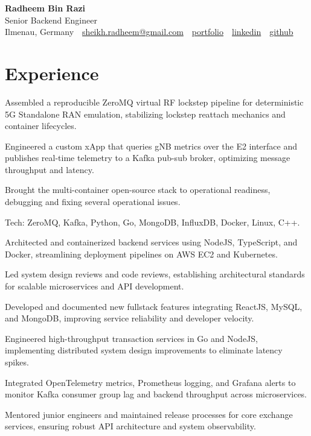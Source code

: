 \documentclass[10pt,a4paper]{resume}
\makeatletter
\newcommand{\Portfolio}{https://radheem.github.io/my-cv}
\newcommand{\PortfolioText}{portfolio}
\newcommand{\GitHub}{https://github.com/radheem}
\newcommand{\LinkedIn}{https://www.linkedin.com/in/radheem-razi}
\newcommand{\Email}{sheikh.radheem@gmail.com}
\makeatother
\begin{document}
\begin{center}
  {\huge\bfseries Radheem Bin Razi}\\[3pt]
  {\large Senior Backend Engineer}\\[6pt]
  \small
  Ilmenau, Germany \,\textbar\,
  \href{mailto:\Email}{\Email} \,\textbar\,
  \href{\Portfolio}{\PortfolioText} \,\textbar\,
  \href{\LinkedIn}{linkedin} \,\textbar\,
  \href{\GitHub}{github}
\end{center}
\vspace{2pt}

\section{Experience}

\bullets
  \item Assembled a reproducible ZeroMQ virtual RF lockstep pipeline for deterministic 5G Standalone RAN emulation, stabilizing lockstep reattach mechanics and container lifecycles.
  \item Engineered a custom xApp that queries gNB metrics over the E2 interface and publishes real-time telemetry to a Kafka pub-sub broker, optimizing message throughput and latency.
  \item Brought the multi-container open-source stack to operational readiness, debugging and fixing several operational issues.
  \item Tech: ZeroMQ, Kafka, Python, Go, MongoDB, InfluxDB, Docker, Linux, C++.
\bulletsend
\vspace{1.5pt}
\bullets
  \item Architected and containerized backend services using NodeJS, TypeScript, and Docker, streamlining deployment pipelines on AWS EC2 and Kubernetes.
  \item Led system design reviews and code reviews, establishing architectural standards for scalable microservices and API development.
  \item Developed and documented new fullstack features integrating ReactJS, MySQL, and MongoDB, improving service reliability and developer velocity.
\bulletsend
\vspace{1.5pt}
\bullets
  \item Engineered high-throughput transaction services in Go and NodeJS, implementing distributed system design improvements to eliminate latency spikes.
  \item Integrated OpenTelemetry metrics, Prometheus logging, and Grafana alerts to monitor Kafka consumer group lag and backend throughput across microservices.
  \item Mentored junior engineers and maintained release processes for core exchange services, ensuring robust API architecture and system observability.
\bulletsend
\vspace{1.5pt}
\end{document}
